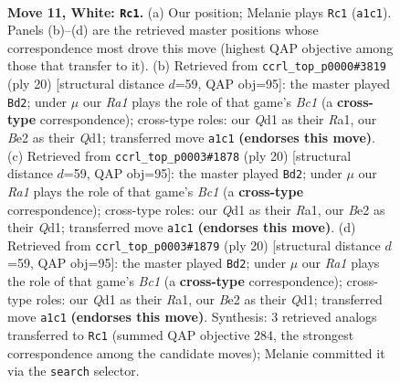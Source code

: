 \documentclass[11pt]{article}
\begin{document}
\clearpage

\begin{figure}[p]\centering
\begin{subfigure}{0.46\textwidth}\centering
\resizebox{\linewidth}{!}{%
\newchessgame
\chessboard[
  setfen={rn1b1rk1/ppqb1ppp/4pn2/2Pp4/3P4/2N2N2/PP1BBPPP/R2Q1RK1 w - - 7 11},
  showmover=false,
  pgfstyle=straightmove, color=movearrow, markmove={a1-c1}
]}
\caption{}
\end{subfigure}\hfill
\begin{subfigure}{0.46\textwidth}\centering
\resizebox{\linewidth}{!}{%
\newchessgame
\chessboard[
  setfen={rnb2rk1/2q1ppbp/p4np1/1pP5/8/2N1PN2/PP2BPPP/R1BQ1RK1 w - - 1 11},
  showmover=false,
  pgfstyle=straightmove, color=movearrow, markmove={c1-d2}
]}
\caption{}
\end{subfigure}
\\[4pt]
\begin{subfigure}{0.46\textwidth}\centering
\resizebox{\linewidth}{!}{%
\newchessgame
\chessboard[
  setfen={rnb2rk1/2q1ppbp/p4np1/1pP5/8/2N1PN2/PP2BPPP/R1BQ1RK1 w - - 1 11},
  showmover=false,
  pgfstyle=straightmove, color=movearrow, markmove={c1-d2}
]}
\caption{}
\end{subfigure}\hfill
\begin{subfigure}{0.46\textwidth}\centering
\resizebox{\linewidth}{!}{%
\newchessgame
\chessboard[
  setfen={rnb2rk1/2q1ppbp/p4np1/1pP5/8/2N1PN2/PP2BPPP/R1BQ1RK1 w - - 1 11},
  showmover=false,
  pgfstyle=straightmove, color=movearrow, markmove={c1-d2}
]}
\caption{}
\end{subfigure}
\caption{\textbf{Move 11, White: \texttt{Rc1}.} (a) Our position; Melanie plays \texttt{Rc1} (\texttt{a1c1}). Panels (b)--(d) are the retrieved master positions whose correspondence most drove this move (highest QAP objective among those that transfer to it). (b) Retrieved from \texttt{ccrl\_top\_p0000\#3819} (ply 20) [structural distance $d$=59, QAP obj=95]: the master played \texttt{Bd2}; under $\mu$ our \emph{Ra1} plays the role of that game's \emph{Bc1} (a \textbf{cross-type} correspondence); cross-type roles: our \emph{Q}d1 as their \emph{R}a1, our \emph{B}e2 as their \emph{Q}d1; transferred move \texttt{a1c1} \textbf{(endorses this move)}. (c) Retrieved from \texttt{ccrl\_top\_p0003\#1878} (ply 20) [structural distance $d$=59, QAP obj=95]: the master played \texttt{Bd2}; under $\mu$ our \emph{Ra1} plays the role of that game's \emph{Bc1} (a \textbf{cross-type} correspondence); cross-type roles: our \emph{Q}d1 as their \emph{R}a1, our \emph{B}e2 as their \emph{Q}d1; transferred move \texttt{a1c1} \textbf{(endorses this move)}. (d) Retrieved from \texttt{ccrl\_top\_p0003\#1879} (ply 20) [structural distance $d$=59, QAP obj=95]: the master played \texttt{Bd2}; under $\mu$ our \emph{Ra1} plays the role of that game's \emph{Bc1} (a \textbf{cross-type} correspondence); cross-type roles: our \emph{Q}d1 as their \emph{R}a1, our \emph{B}e2 as their \emph{Q}d1; transferred move \texttt{a1c1} \textbf{(endorses this move)}. Synthesis: 3 retrieved analogs transferred to \texttt{Rc1} (summed QAP objective 284, the strongest correspondence among the candidate moves); Melanie committed it via the \texttt{search} selector.}
\label{fig:thought-m20}
\end{figure}
\end{document}

